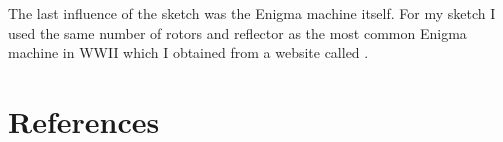 \documentclass[12pt,a4paper]{article}
\begin{document}
		\begin{center}
			\\
			\vspace{0.5cm}
			\\
		\end{center}
		\vspace{0.5cm}
		The last influence of the sketch was the Enigma machine itself. For my sketch I used the same 
		number of rotors and reflector as the most common Enigma machine in WWII which I obtained from 
		a website called \textcite{CryptoMuseum2023}.
	
	\newpage

	\section{References}
	\printbibliography[heading=bibempty]
\end{document}
